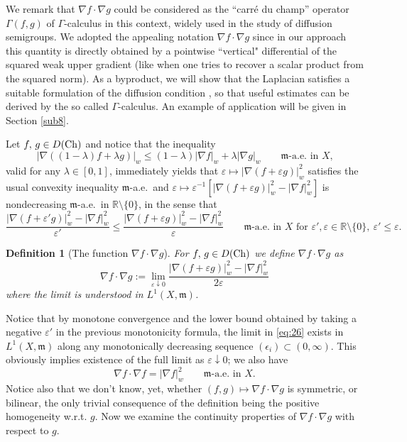 \documentclass[reqno,11pt]{article}
\numberwithin{equation}{section}
\newcommand{\C}{\mathbb{C}}
\newcommand{\R}{\mathbb{R}}
\newcommand{\mm}{{\mbox{\boldmath$m$}}}
\newcommand{\eps}{\varepsilon}
\newtheorem{definition}[theorem]{Definition}
\newcommand{\weakgrad}[1]{|\nabla #1|_w}                %
\renewcommand{\C}{{\rm Ch}}
\renewcommand{\mm}{\mathfrak m}
\begin{document}
We remark that $\nabla f\cdot \nabla g$ could be considered as the
``carr\'e du champ'' operator $\Gamma(f,g)$ of $\Gamma$-calculus in
this context, widely used in the study of diffusion semigroups. We
adopted the appealing notation $\nabla f\cdot\nabla g$ since in our
approach this quantity is directly obtained by a pointwise
``vertical" differential of the squared weak upper gradient (like
when one tries to recover a scalar product from the squared norm).
As a byproduct, we will show that the Laplacian satisfies a suitable
formulation of the diffusion condition \cite[1.3]{Bakry06}, so that
useful estimates can be derived by the so called $\Gamma$-calculus.
An example of application will be given in Section \ref{sub8}.

Let $f,\,g\in D(\C)$ and notice that the inequality
\[
\weakgrad{((1-\lambda)f+\lambda g)}\leq(1-\lambda)\weakgrad
f+\lambda\weakgrad g\qquad\text{$\mm$-a.e.~in $X$,}
\]
valid for any $\lambda\in[0,1]$, immediately yields that
$\eps\mapsto \weakgrad{(f+\eps g)}^2$ satisfies the usual convexity
inequality $\mm$-a.e.\ and $\eps\mapsto\eps^{-1}[\weakgrad{(f+\eps
g)}^2-\weakgrad f^2]$ is nondecreasing $\mm$-a.e.~in  $\R\setminus
\{0\}$, in the sense that
\[
\frac{\weakgrad{(f+\eps' g)}^2-\weakgrad f^2}{\eps'}\leq
\frac{\weakgrad{(f+\eps g)}^2-\weakgrad
f^2}{\eps}\qquad\text{$\mm$-a.e.~in $X$ for $\eps',\eps\in
\R\setminus \{0\},\ \eps'\leq\eps$.}
\]
%
\begin{definition}[The function $\nabla f\cdot\nabla g$]
For $f,\,g\in D(\C)$ we define $\nabla f\cdot\nabla g$ as
\begin{equation}
\nabla f\cdot\nabla g:=\lim_{\eps\downarrow
0}\frac{\weakgrad{(f+\eps g)}^2-\weakgrad f^2}{2\eps} \label{eq:26}
\end{equation}
where the limit is understood in $L^1(X,\mm)$.
\end{definition}
%
Notice that by monotone convergence and the lower bound obtained by
taking a negative $\eps'$ in the previous monotonicity formula, the
limit in \eqref{eq:26} exists in $L^1(X,\mm)$ along any
monotonically decreasing sequence $(\epsilon_i)\subset (0,\infty)$.
This obviously implies existence of the full limit as
$\eps\downarrow 0$; we also have
\begin{equation}
\label{eq:doteweakgrad} \nabla f\cdot\nabla f=\weakgrad
f^2\qquad\text{$\mm$-a.e.~in $X$.}
\end{equation}
Notice also that we don't know, yet, whether $(f,g)\mapsto\nabla
f\cdot\nabla g$ is symmetric, or bilinear, the only trivial
consequence of the definition being the positive homogeneity w.r.t.
$g$. Now we examine the continuity properties of $\nabla
f\cdot\nabla g$ with respect to $g$.
\end{document}
